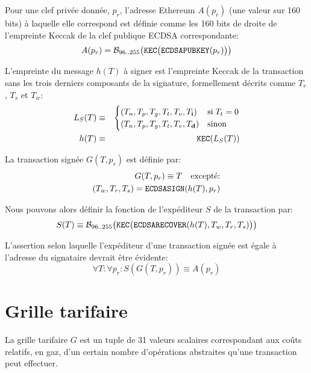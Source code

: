 \documentclass[9pt,oneside]{amsart}
\begin{document}
Pour une clef privée donnée, $p_r$, l'adresse Ethereum $A(p_r)$ (une valeur sur 160 bits) à laquelle elle correspond est définie comme les 160 bits de droite de l'empreinte Keccak de la clef publique ECDSA correspondante:
\begin{equation}
A(p_r) = \mathcal{B}_{96..255}\big(\mathtt{\tiny KEC}\big( \mathtt{\small ECDSAPUBKEY}(p_r) \big) \big)
\end{equation}

L'empreinte du message $h(T)$ à signer est l'empreinte Keccak de la transaction sans les trois derniers composants de la signature, formellement décrits comme $T_r$, $T_s$ et $T_w$:
\begin{eqnarray}
L_S(T) & \equiv & \begin{cases}
(T_n, T_p, T_g, T_t, T_v, T_\mathbf{i}) & \text{si} \; T_t = 0\\
(T_n, T_p, T_g, T_t, T_v, T_\mathbf{d}) & \text{sinon}
\end{cases} \\
h(T) & \equiv & \mathtt{\small KEC}( L_S(T) )
\end{eqnarray}

La transaction signée $G(T, p_r)$ est définie par:
\begin{eqnarray}
G(T, p_r) \equiv T \quad \text{excepté:} \\
(T_w, T_r, T_s) = \mathtt{\small ECDSASIGN}(h(T), p_r)
\end{eqnarray}

Nous pouvons alors définir la fonction de l'expéditeur $S$ de la transaction par:
\begin{equation}
S(T) \equiv \mathcal{B}_{96..255}\big(\mathtt{\tiny KEC}\big( \mathtt{\small ECDSARECOVER}(h(T), T_w, T_r, T_s) \big) \big)
\end{equation}

L'assertion selon laquelle l'expéditeur d'une transaction signée est égale à l'adresse du signataire devrait être évidente:
\begin{equation}
\forall T: \forall p_r: S(G(T, p_r)) \equiv A(p_r)
\end{equation}

\section{Grille tarifaire}\label{app:fees}

La grille tarifaire $G$ est un tuple de 31 valeurs scalaires correspondant aux coûts relatifs, en gaz, d'un certain nombre d'opérations abstraites qu'une transaction peut effectuer.
\end{document}
